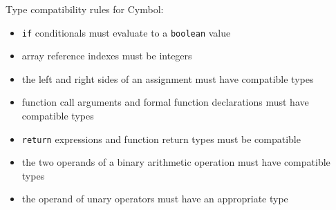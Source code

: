 Type compatibility rules for Cymbol:
\begin{itemize}
\item \verb=if= conditionals must evaluate to a \verb=boolean= value
\item array reference indexes must be integers
\item the left and right sides of an assignment must have compatible types
\item function call arguments and formal function declarations
must have compatible types
\item \verb=return= expressions and function return types must be compatible
\item the two operands of a binary arithmetic operation
must have compatible types
\item the operand of unary operators must have an appropriate type
\end{itemize}
